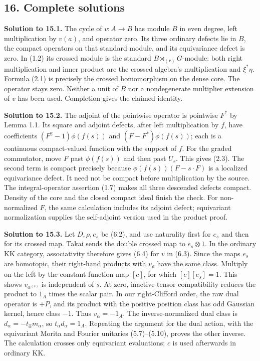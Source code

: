 \documentclass[
  11pt,
]{article}
\begin{document}
\subsection{16. Complete solutions}\label{complete-solutions}

\textbf{Solution to 15.1.} The cycle of \(v:A\to B\) has module \(B\) in
even degree, left multiplication by \(v(a)\), and operator zero. Its
three ordinary defects lie in \(B\), the compact operators on that
standard module, and its equivariance defect is zero. In (1.2) its
crossed module is the standard \(B\rtimes_{(r)}G\)-module: both right
multiplication and inner product are the crossed algebra's
multiplication and \(\xi^*\eta\). Formula (2.1) is precisely the crossed
homomorphism on the dense core. The operator stays zero. Neither a unit
of \(B\) nor a nondegenerate multiplier extension of \(v\) has been
used. Completion gives the claimed identity.

\textbf{Solution to 15.2.} The adjoint of the pointwise operator is
pointwise \(F^*\) by Lemma 1.1. Its square and adjoint defects, after
left multiplication by \(f\), have coefficients \((F^2-1)\phi(f(s))\)
and \((F-F^*)\phi(f(s))\); each is a continuous compact-valued function
with the support of \(f\). For the graded commutator, move \(F\) past
\(\phi(f(s))\) and then past \(U_s\). This gives (2.3). The second term
is compact precisely because \(\phi(f(s))(F-s\cdot F)\) is a localized
equivariance defect. It need not be compact before multiplication by the
source. The integral-operator assertion (1.7) makes all three descended
defects compact. Density of the core and the closed compact ideal finish
the check. For non-normalized \(F\), the same calculation includes its
adjoint defect; equivariant normalization supplies the self-adjoint
version used in the product proof.

\textbf{Solution to 15.3.} Let \(D,\rho,e_s\) be (6.2), and use
naturality first for \(e_s\) and then for its crossed map. Takai sends
the double crossed map to \(e_s\otimes1\). In the ordinary KK category,
associativity therefore gives (6.4) for \(v\) in (6.3). Since the maps
\(e_s\) are homotopic, their right-hand products with \(v_\rho\) have
the same class. Multiply on the left by the constant-function map
\([c]\), for which \([c][e_s]=1\). This shows \(v_{\alpha^{(s)}}\) is
independent of \(s\). At zero, inactive tensor compatibility reduces the
product to \(1_A\) times the scalar pair. In our right-Clifford order,
the raw dual operator is \(+P\), and its product with the positive
position class has odd Gaussian kernel, hence class \(-1\). Thus
\(v_\alpha=-1_A\). The inverse-normalized dual class is
\(d_\alpha=-t_{\widehat\alpha}m_\alpha\), so \(t_\alpha d_\alpha=1_A\).
Repeating the argument for the dual action, with the equivariant Morita
and Fourier unitaries (5.7)--(5.10), proves the other inverse. The
calculation crosses only equivariant evaluations; \(c\) is used
afterwards in ordinary KK.
\end{document}
